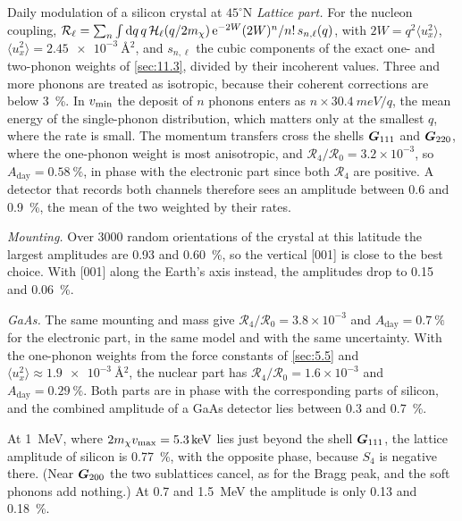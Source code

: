 \begin{workedexample}{Daily modulation of a silicon crystal at $45^\circ$N}
\emph{Lattice part.} For the nucleon coupling, $\mathcal{R}_\ell = \sum_n\int\mathrm{d} q\,q\,\mathcal{H}_\ell(q/2m_{\chi})\,\mathrm{e}^{-2W}(2W)^n/n!\,s_{n,\ell}(q)$, with $2W = q^2\langle u_x^2\rangle$, $\langle u_x^2\rangle = \SI{2.45e-3}{\angstrom^2}$, and $s_{n,\ell}$ the cubic components of the exact one- and two-phonon weights of \cref{sec:11.3}, divided by their incoherent values. Three and more phonons are treated as isotropic, because their coherent corrections are below \SI{3}{\percent}. In $v_{\mathrm{min}}$ the deposit of $n$ phonons enters as $n\times\SI{30.4}{meV}/q$, the mean energy of the single-phonon distribution, which matters only at the smallest $q$, where the rate is small. The momentum transfers cross the shells $\bm{G}_{111}$ and $\bm{G}_{220}$, where the one-phonon weight is most anisotropic, and $\mathcal{R}_4/\mathcal{R}_0 = 3.2\times10^{-3}$, so $A_{\mathrm{day}} = \SI{0.58}{\percent}$, in phase with the electronic part since both $\mathcal{R}_4$ are positive. A detector that records both channels therefore sees an amplitude between 0.6 and \SI{0.9}{\percent}, the mean of the two weighted by their rates.

\emph{Mounting.} Over 3000 random orientations of the crystal at this latitude the largest amplitudes are 0.93 and \SI{0.60}{\percent}, so the vertical [001] is close to the best choice. With [001] along the Earth's axis instead, the amplitudes drop to 0.15 and \SI{0.06}{\percent}.

\emph{GaAs.} The same mounting and mass give $\mathcal{R}_4/\mathcal{R}_0 = 3.8\times10^{-3}$ and $A_{\mathrm{day}} = \SI{0.7}{\percent}$ for the electronic part, in the same model and with the same uncertainty. With the one-phonon weights from the force constants of \cref{sec:5.5} and $\langle u_x^2\rangle \approx \SI{1.9e-3}{\angstrom^2}$, the nuclear part has $\mathcal{R}_4/\mathcal{R}_0 = 1.6\times10^{-3}$ and $A_{\mathrm{day}} = \SI{0.29}{\percent}$. Both parts are in phase with the corresponding parts of silicon, and the combined amplitude of a GaAs detector lies between 0.3 and \SI{0.7}{\percent}.
\end{workedexample}

At \SI{1}{MeV}, where $2m_{\chi} v_{\mathrm{max}} = \SI{5.3}{keV}$ lies just beyond the shell $\bm{G}_{111}$, the lattice amplitude of silicon is \SI{0.77}{\percent}, with the opposite phase, because $S_4$ is negative there. (Near $\bm{G}_{200}$ the two sublattices cancel, as for the Bragg peak, and the soft phonons add nothing.) At 0.7 and \SI{1.5}{MeV} the amplitude is only 0.13 and \SI{0.18}{\percent}.

